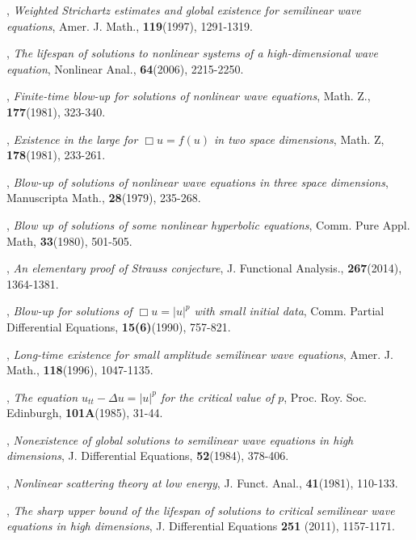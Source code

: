 \documentclass[a4paper,12pt]{article}
\numberwithin{equation}{section}
\begin{document}

\begin{thebibliography}{20}

,
{\it Weighted Strichartz estimates and global existence for semilinear wave equations},
Amer. J. Math., {\bf 119}(1997), 1291-1319.

,
{\it The lifespan of solutions to nonlinear systems of a high-dimensional wave equation},
Nonlinear Anal., {\bf 64}(2006), 2215-2250.

,
{\it Finite-time blow-up for solutions of nonlinear wave equations},
Math. Z., {\bf 177}(1981), 323-340.

,
{\it Existence in the large for $\Box u=f(u)$ in two space dimensions},
Math. Z, {\bf 178}(1981), 233-261.

,
{\it Blow-up of solutions of nonlinear wave equations in three space dimensions},
Manuscripta Math., {\bf 28}(1979), 235-268.

,
{\it Blow up of solutions of some nonlinear hyperbolic equations},
Comm. Pure Appl. Math, {\bf 33}(1980), 501-505.

,
{\it An elementary proof of Strauss conjecture},
J. Functional Analysis., {\bf 267}(2014), 1364-1381.

,
{\it Blow-up for solutions of $\Box u=|u|^p$ with small initial data},
Comm. Partial Differential Equations, {\bf 15(6)}(1990), 757-821.

,
{\it Long-time existence for small amplitude semilinear wave equations},
Amer. J. Math., {\bf 118}(1996), 1047-1135.

,
{\it The equation $u_{tt}-\Delta u=|u|^p$ for the critical value of $p$},
Proc. Roy. Soc. Edinburgh, {\bf 101A}(1985), 31-44.

,
{\it Nonexistence of global solutions to semilinear wave equations in high dimensions},
J. Differential Equations, {\bf 52}(1984), 378-406.

,
{\it Nonlinear scattering theory at low energy},
J. Funct. Anal., {\bf 41}(1981), 110-133. 

, 
{\it The sharp upper bound of the lifespan of solutions to critical semilinear wave equations 
in high dimensions},
J. Differential Equations {\bf 251} (2011), 1157-1171.


\end{thebibliography}
\end{document}
